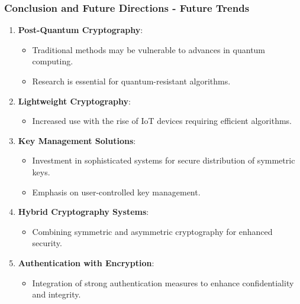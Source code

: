 \documentclass{beamer}
\begin{document}
\begin{frame}[fragile]
    \frametitle{Conclusion and Future Directions - Future Trends}
    \begin{enumerate}
        \item \textbf{Post-Quantum Cryptography}:
        \begin{itemize}
            \item Traditional methods may be vulnerable to advances in quantum computing.
            \item Research is essential for quantum-resistant algorithms.
        \end{itemize}
        
        \item \textbf{Lightweight Cryptography}:
        \begin{itemize}
            \item Increased use with the rise of IoT devices requiring efficient algorithms.
        \end{itemize}
        
        \item \textbf{Key Management Solutions}:
        \begin{itemize}
            \item Investment in sophisticated systems for secure distribution of symmetric keys.
            \item Emphasis on user-controlled key management.
        \end{itemize}
        
        \item \textbf{Hybrid Cryptography Systems}:
        \begin{itemize}
            \item Combining symmetric and asymmetric cryptography for enhanced security.
        \end{itemize}
        
        \item \textbf{Authentication with Encryption}:
        \begin{itemize}
            \item Integration of strong authentication measures to enhance confidentiality and integrity.
        \end{itemize}
    \end{enumerate}
\end{frame}
\end{document}
